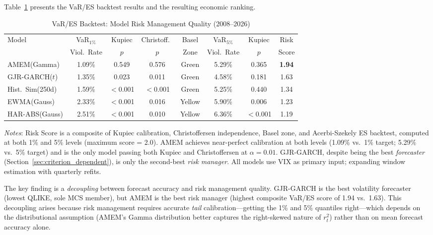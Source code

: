 \documentclass[12pt,a4paper]{article}
\begin{document}
Table~\ref{tab:var_backtest} presents the VaR/ES backtest results and the resulting economic ranking.

\begin{table}[H]
\centering
\small
\begin{threeparttable}
\caption{VaR/ES Backtest: Model Risk Management Quality (2008--2026)}
\label{tab:var_backtest}
\begin{tabular}{@{}lccccccc@{}}
\toprule
Model & VaR$_{1\%}$ & Kupiec & Christoff.\ & Basel & VaR$_{5\%}$ & Kupiec & Risk \\
 & Viol.\ Rate & $p$ & $p$ & Zone & Viol.\ Rate & $p$ & Score \\
\midrule
AMEM(Gamma) & 1.09\% & 0.549 & 0.576 & Green & 5.29\% & 0.365 & \textbf{1.94} \\
GJR-GARCH($t$) & 1.35\% & 0.023 & 0.011 & Green & 4.58\% & 0.181 & 1.63 \\
Hist.\ Sim(250d) & 1.59\% & $<$0.001 & $<$0.001 & Green & 5.25\% & 0.440 & 1.34 \\
EWMA(Gauss) & 2.33\% & $<$0.001 & 0.016 & Yellow & 5.90\% & 0.006 & 1.23 \\
HAR-ABS(Gauss) & 2.51\% & $<$0.001 & 0.010 & Yellow & 6.36\% & $<$0.001 & 1.19 \\
\bottomrule
\end{tabular}
\begin{tablenotes}
\small
\item \textit{Notes}: Risk Score is a composite of Kupiec calibration, Christoffersen independence, Basel zone, and Acerbi-Szekely ES backtest, computed at both 1\% and 5\% levels (maximum score = 2.0). AMEM achieves near-perfect calibration at both levels (1.09\% vs.\ 1\% target; 5.29\% vs.\ 5\% target) and is the only model passing both Kupiec and Christoffersen at $\alpha = 0.01$. GJR-GARCH, despite being the best \emph{forecaster} (Section~\ref{sec:criterion_dependent}), is only the second-best \emph{risk manager}. All models use VIX as primary input; expanding window estimation with quarterly refits.
\end{tablenotes}
\end{threeparttable}
\end{table}

The key finding is a \emph{decoupling} between forecast accuracy and risk management quality. GJR-GARCH is the best volatility forecaster (lowest QLIKE, sole MCS member), but AMEM is the best risk manager (highest composite VaR/ES score of 1.94 vs.\ 1.63). This decoupling arises because risk management requires accurate \emph{tail} calibration---getting the 1\% and 5\% quantiles right---which depends on the distributional assumption (AMEM's Gamma distribution better captures the right-skewed nature of $r_t^2$) rather than on mean forecast accuracy alone.
\end{document}
